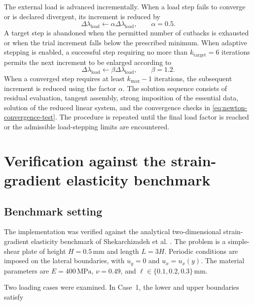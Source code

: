 \documentclass[preprint,12pt]{elsarticle}
\begin{document}
The external load is advanced incrementally. When a load step fails to
converge or is declared divergent, its increment is reduced by
\begin{equation}
 \Delta\lambda_{\mathrm{load}}\leftarrow\alpha\Delta\lambda_{\mathrm{load}},
 \qquad \alpha=0.5.
 \label{eq:load-cutback}
\end{equation}
A target step is abandoned when the permitted number of cutbacks is
exhausted or when the trial increment falls below the prescribed minimum.
When adaptive stepping is enabled, a successful step requiring no more
than $k_{\mathrm{target}}=6$ iterations permits the next increment to be
enlarged according to
\begin{equation}
 \Delta\lambda_{\mathrm{load}}\leftarrow\beta\Delta\lambda_{\mathrm{load}},
 \qquad \beta=1.2.
 \label{eq:load-growth}
\end{equation}
When a converged step requires at least $k_{\max}-1$ iterations, the
subsequent increment is reduced using the factor $\alpha$. The solution
sequence consists of residual evaluation, tangent assembly, strong
imposition of the essential data, solution of the reduced linear system,
and the convergence checks in \eqref{eq:newton-convergence-test}. The
procedure is repeated until the final load factor is reached or the
admissible load-stepping limits are encountered.

\section{Verification against the strain-gradient elasticity benchmark}

\label{sec:benchmark-verification}

\subsection{Benchmark setting}

\label{sec:benchmark-setting}

The implementation was verified against the analytical two-dimensional
strain-gradient elasticity benchmark of Shekarchizadeh et al.
\cite{ShekarchizadehAbaliBersani2022}. The problem is a simple-shear
plate of height $H=0.5\,\mathrm{mm}$ and length $L=3H$. Periodic
conditions are imposed on the lateral boundaries, with $u_y=0$ and
$u_x=u_x(y)$. The material parameters are $E=400\,\mathrm{MPa}$,
$\nu=0.49$, and $\ell\in\{0.1,0.2,0.3\}\,\mathrm{mm}$.

Two loading cases were examined. In Case~1, the lower and upper
boundaries satisfy
\end{document}
